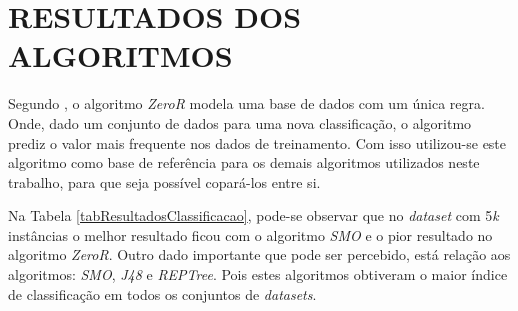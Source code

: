\documentclass[
	12pt,				%
	openright,			%
	oneside,	
	a4paper,				%
	english,				%
	brazil				%
]{abntex2/abntex2} %
\begin{document}
	\section{RESULTADOS DOS ALGORITMOS}
	\vspace{1\baselineskip}
	
	Segundo \cite{witten:2011}, o algoritmo \textit{ZeroR} modela uma base de dados com um única regra. Onde, dado um conjunto de dados para uma nova classificação, o algoritmo prediz o valor mais frequente nos dados de treinamento. Com isso utilizou-se este algoritmo como base de referência para os demais algoritmos utilizados neste trabalho, para que seja possível copará-los entre si.
	
	Na Tabela \ref{tabResultadosClassificacao}, pode-se observar que no \textit{dataset} com 5\textit{k} instâncias o melhor resultado ficou com o algoritmo \textit{SMO} e o pior resultado no algoritmo \textit{ZeroR}. Outro dado importante que pode ser percebido, está relação aos algoritmos: \textit{SMO}, \textit{J48} e \textit{REPTree}. Pois estes algoritmos obtiveram o maior índice de classificação em todos os conjuntos de \textit{datasets}.
	\\
	
\end{document}
